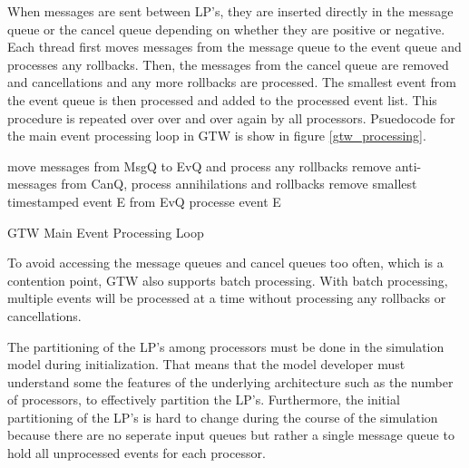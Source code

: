 \documentclass[11pt]{book}
\begin{document}
\noindent
When messages are sent between LP's, they are inserted directly in the message queue or
the cancel queue depending on whether they are positive or negative. Each thread first moves
messages from the message queue to the event queue and processes any rollbacks. Then, the
messages from the cancel queue are removed and cancellations and any more rollbacks are
processed. The smallest event from the event queue is then processed and added to the
processed event list. This procedure is repeated over over and over again by all processors.
Psuedocode for the main event processing loop in GTW is show in figure \ref{gtw_processing}.

\begin{algorithm}
\DontPrintSemicolon
\SetAlgoVlined
     {
        move messages from MsgQ to EvQ and process any rollbacks\;
        remove anti-messages from CanQ, process annihilations and rollbacks\;
        remove smallest timestamped event E from EvQ\;
        processe event E\;
    }
\caption{GTW Main Event Processing Loop\cite{das-94}\cite{fujimoto-94}\label{gtw_processing}}
\end{algorithm}

\noindent
To avoid accessing the message queues and cancel queues too often, which is a contention point,
GTW also supports batch processing. With batch processing, multiple events will be processed
at a time without processing any rollbacks or cancellations.

The partitioning of the LP's among processors must be done in the simulation model during
initialization. That means that the model developer must understand some the features of
the underlying architecture such as the number of processors, to effectively partition the
LP's. Furthermore, the initial partitioning of the LP's is hard to change during the course
of the simulation because there are no seperate input queues but rather a single message
queue to hold all unprocessed events for each processor.

\end{document}
